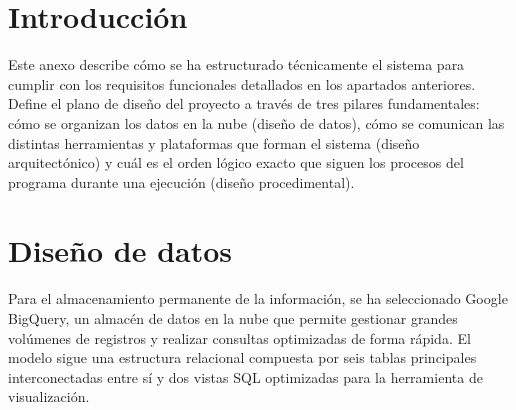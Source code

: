 
\section{Introducción}
Este anexo describe cómo se ha estructurado técnicamente el sistema para cumplir con los requisitos funcionales detallados en los apartados anteriores. Define el plano de diseño del proyecto a través de tres pilares fundamentales: cómo se organizan los datos en la nube (diseño de datos), cómo se comunican las distintas herramientas y plataformas que forman el sistema (diseño arquitectónico) y cuál es el orden lógico exacto que siguen los procesos del programa durante una ejecución (diseño procedimental).

\section{Diseño de datos}
Para el almacenamiento permanente de la información, se ha seleccionado Google BigQuery, un almacén de datos en la nube que permite gestionar grandes volúmenes de registros y realizar consultas optimizadas de forma rápida. El modelo sigue una estructura relacional compuesta por seis tablas principales interconectadas entre sí y dos vistas SQL optimizadas para la herramienta de visualización.

